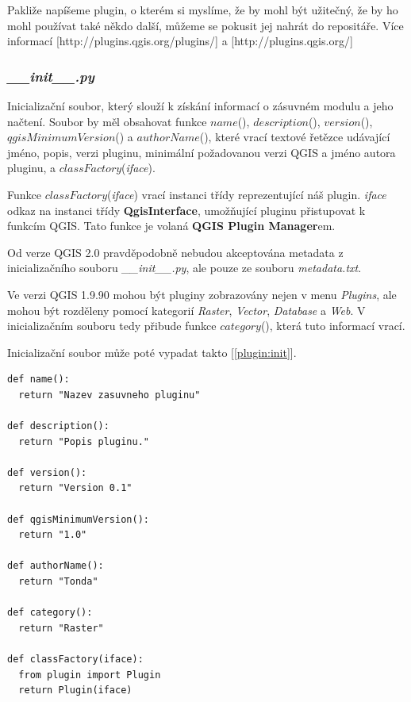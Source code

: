 Pakliže napíšeme plugin, o kterém si myslíme, že by mohl být užitečný, že by ho mohl používat také někdo další, můžeme se pokusit jej nahrát do repositáře. Více informací [http://plugins.qgis.org/plugins/] a [http://plugins.qgis.org/]

\subsubsection*{\textit{\_\_init\_\_.py}}
Inicializační soubor, který slouží k získání informací o zásuvném modulu a jeho načtení. Soubor by měl obsahovat funkce $name$(), $description$(), $version$(), $qgisMinimumVersion$() a $authorName$(), které vrací textové řetězce udávající jméno, popis, verzi pluginu, minimální požadovanou verzi QGIS a jméno autora pluginu, a $classFactory$(\textit{iface}).

Funkce $classFactory$(\textit{iface}) vrací instanci třídy reprezentující náš plugin. \textit{iface} odkaz na instanci třídy \textbf{QgisInterface}, umožňující pluginu přistupovat k funkcím QGIS. Tato funkce je volaná \textbf{QGIS Plugin Manager}em.

Od verze QGIS 2.0 pravděpodobně nebudou akceptována metadata z inicializačního souboru \textit{\_\_init\_\_.py}, ale pouze ze souboru \textit{metadata.txt}.

Ve verzi QGIS 1.9.90 mohou být pluginy zobrazovány nejen v menu \textit{Plugins}, ale mohou být rozděleny pomocí kategorií \textit{Raster}, \textit{Vector}, \textit{Database} a \textit{Web}. V inicializačním souboru tedy přibude funkce $category$(), která tuto informací vrací.

Inicializační soubor může poté vypadat takto [\autoref{plugin:init}]. \\

\begin{lstlisting}[caption={\_\_init\_\_.py - inicializační soubor},label=plugin:init]
def name():
  return "Nazev zasuvneho pluginu"

def description():
  return "Popis pluginu."

def version():
  return "Version 0.1"

def qgisMinimumVersion():
  return "1.0"

def authorName():
  return "Tonda"

def category():
  return "Raster"

def classFactory(iface):
  from plugin import Plugin
  return Plugin(iface)
\end{lstlisting}

